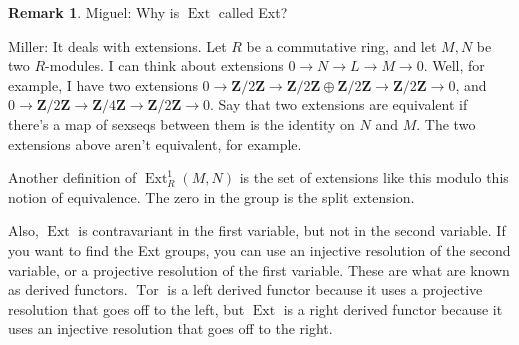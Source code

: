 \documentclass{amsart}
\theoremstyle{theorem}
\theoremstyle{definition}
\newtheorem{remark}[theorem]{Remark}
\DeclareMathOperator{\Ext}{Ext}
\DeclareMathOperator{\Tor}{Tor}
\newcommand{\Z}{\mathbf Z}
\begin{document}
\begin{remark}
Miguel: Why is $\Ext$ called Ext?

Miller: It deals with extensions. Let $R$ be a commutative ring, and let $M,N$ be two $R$-modules. I can think about extensions $0\to N\to L\to M\to 0$. Well, for example, I have two extensions $0\to\Z/2\Z\to\Z/2\Z\oplus\Z/2\Z\to\Z/2\Z\to 0$, and $0\to \Z/2\Z\to\Z/4\Z\to\Z/2\Z\to 0$. Say that two extensions are equivalent if there's a map of sexseqs between them is the identity on $N$ and $M$. The two extensions above aren't equivalent, for example.

Another definition of $\Ext^1_R(M,N)$ is the set of extensions like this modulo this notion of equivalence. The zero in the group is the split extension.

Also, $\Ext$ is contravariant in the first variable, but not in the second variable. If you want to find the Ext groups, you can use an injective resolution of the second variable, or a projective resolution of the first variable. These are what are known as derived functors. $\Tor$ is a left derived functor because it uses a projective resolution that goes off to the left, but $\Ext$ is a right derived functor because it uses an injective resolution that goes off to the right.
\end{remark}
\end{document}
